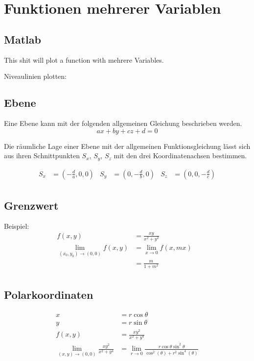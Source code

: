 \section{Funktionen mehrerer Variablen}

\subsection{Matlab}

This shit will plot a function with mehrere Variables.


Niveaulinien plotten:



\subsection{Ebene}

Eine Ebene kann mit der folgenden allgemeinen Gleichung beschrieben werden.
\begin{equation*}
    ax + by + cz + d = 0
\end{equation*}

Die r\"aumliche Lage einer Ebene mit der allgemeinen  Funktionsgleichung l\"asst
sich aus ihren Schnittpunkten $S_x$, $S_y$, $S_z$ mit den drei Koordinatenachsen
bestimmen.

\begin{align*}
    S_x &= \left(-\frac{d}{a}, 0, 0\right) &
    S_y &= \left(0, -\frac{d}{b}, 0\right) &
    S_z &= \left(0, 0, -\frac{d}{c}\right) \\
\end{align*}


\subsection{Grenzwert}

Beispiel:
\begin{align*}
    f(x,y) &= \frac{xy}{x^2+ y^2} & \\
    \lim_{(x_0,y_0) \to (0,0)} f(x,y) &= \lim_{x \to 0} f(x,mx) \\
    &= \frac{m}{1+m^2} \\
\end{align*}


\subsection{Polarkoordinaten}

\begin{align*}
    x &= r \cos \theta \\
    y &= r \sin \theta \\
    f(x,y) &= \frac{xy^2}{x^2 + y^4} \\
    \lim_{(x,y) \to (0,0)} \frac{xy^2}{x^2 + y^4} &= \lim_{r \to 0} \frac{r\cos\theta\sin^2\theta}{\cos^2(\theta) + r^2\sin^4(\theta)} \\
\end{align*}


